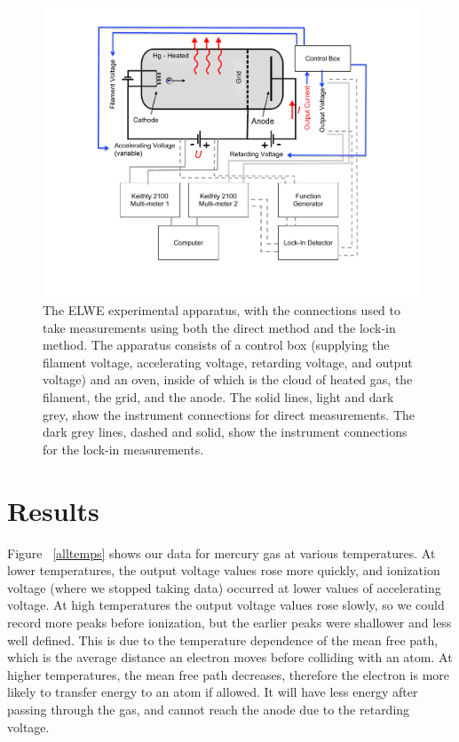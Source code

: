 \documentclass[prb,preprint]{revtex4-1}
\begin{document}
\begin{figure}[h!]
\centering
\includegraphics[width=5in]{set-up.pdf} 
\caption{The ELWE experimental apparatus, with the connections used to take measurements using both the direct method and the lock-in method. The apparatus consists of a control box (supplying the filament voltage, accelerating voltage, retarding voltage, and output voltage) and an oven, inside of which is the cloud of heated gas, the filament, the grid, and the anode. The solid lines, light and dark grey, show the instrument connections for direct measurements. The dark grey lines, dashed and solid, show the instrument connections for the lock-in measurements. }
\label{set-up}
\end{figure}

\section{Results}

Figure ~\ref{alltemps} shows our data for mercury gas at various temperatures. 
At lower temperatures, the output voltage values rose more quickly, and ionization voltage (where we stopped taking data) occurred at lower values of accelerating voltage. 
At high temperatures the output voltage values rose slowly, so we could record more peaks before ionization, but the earlier peaks were shallower and less well defined. 
This is due to the temperature dependence of the mean free path, which is the average distance an electron moves before colliding with an atom. 
At higher temperatures, the mean free path decreases, therefore the electron is more likely to transfer energy to an atom if allowed. It will have less energy after passing through the gas, and cannot reach the anode due to the retarding voltage.
\end{document}
